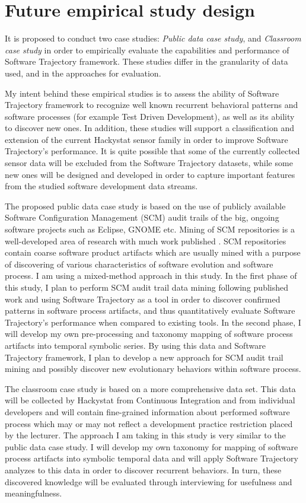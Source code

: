 \documentclass{sig-alternate}
\begin{document}
\section{Future empirical study design}
It is proposed to conduct two case studies: \textit{Public data case study}, and \textit{Classroom case study} in order to empirically evaluate the capabilities and performance of Software Trajectory framework. These studies differ in the granularity of data used, and in the approaches for evaluation. 

My intent behind these empirical studies is to assess the ability of Software Trajectory framework to recognize well known recurrent behavioral patterns and software processes (for example Test Driven Development), as well as its ability to discover new ones. In addition, these studies will support a classification and extension of the current Hackystat sensor family in order to improve Software Trajectory's performance. It is quite possible that some of the currently collected sensor data will be excluded from the Software Trajectory datasets, while some new ones will be designed and developed in order to capture important features from the studied software development data streams. 

The proposed public data case study is based on the use of publicly available Software Configuration Management (SCM) audit trails of the big, ongoing software projects such as Eclipse, GNOME etc. Mining of SCM repositories is a well-developed area of research with much work published \cite{citeulike:5043676}. SCM repositories contain coarse software product artifacts which are usually mined with a purpose of discovering of various characteristics of software evolution and software process. I am using a mixed-method approach in this study. In the first phase of this study, I plan to perform SCM audit trail data mining following published work and using Software Trajectory as a tool in order to discover confirmed patterns in software process artifacts, and thus quantitatively evaluate Software Trajectory's performance when compared to existing tools. In the second phase, I will develop my own pre-processing and taxonomy mapping of software process artifacts into temporal symbolic series. By using this data and Software Trajectory framework, I plan to develop a new approach for SCM audit trail mining and possibly discover new evolutionary behaviors within software process. 

The classroom case study is based on a more comprehensive data set. This data will be collected by Hackystat from Continuous Integration and from individual developers and will contain fine-grained information about performed software process which may or may not reflect a development practice restriction placed by the lecturer. The approach I am taking in this study is very similar to the public data case study. I will develop my own taxonomy for mapping of software process artifacts into symbolic temporal data and will apply Software Trajectory analyzes to this data in order to discover recurrent behaviors. In turn, these discovered knowledge will be evaluated through interviewing for usefulness and meaningfulness. 
\end{document}
